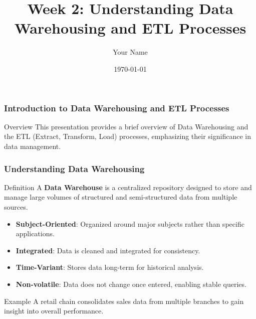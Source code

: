 \documentclass{beamer}
\title{Week 2: Understanding Data Warehousing and ETL Processes}
\author{Your Name}
\institute{Your Institution}
\date{\today}
\begin{document}
\frame{\titlepage}

\begin{frame}[fragile]
    \frametitle{Introduction to Data Warehousing and ETL Processes}
    \begin{block}{Overview}
        This presentation provides a brief overview of Data Warehousing and the ETL (Extract, Transform, Load) processes, emphasizing their significance in data management.
    \end{block}
\end{frame}

\begin{frame}[fragile]
    \frametitle{Understanding Data Warehousing}
    \begin{block}{Definition}
        A \textbf{Data Warehouse} is a centralized repository designed to store and manage large volumes of structured and semi-structured data from multiple sources.
    \end{block}
    \begin{itemize}
        \item \textbf{Subject-Oriented}: Organized around major subjects rather than specific applications.
        \item \textbf{Integrated}: Data is cleaned and integrated for consistency.
        \item \textbf{Time-Variant}: Stores data long-term for historical analysis.
        \item \textbf{Non-volatile}: Data does not change once entered, enabling stable queries.
    \end{itemize}
    
    \begin{block}{Example}
        A retail chain consolidates sales data from multiple branches to gain insight into overall performance.
    \end{block}
\end{frame}
\end{document}
